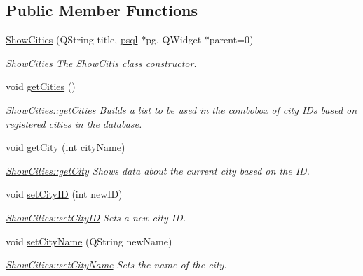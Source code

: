 \subsection*{Public Member Functions}
\begin{DoxyCompactItemize}
\item 
\mbox{\hyperlink{class_show_cities_a71a514390bebd22b5e6ecbb6b731979a}{Show\+Cities}} (Q\+String title, \mbox{\hyperlink{classpsql}{psql}} $\ast$pg, Q\+Widget $\ast$parent=0)
\begin{DoxyCompactList}\small\item\em \mbox{\hyperlink{class_show_cities}{Show\+Cities}} The Show\+Citis class constructor. \end{DoxyCompactList}\item 
\mbox{\label{class_show_cities_a8026675035c0bce6dab846262e1da0c5}} 
void \mbox{\hyperlink{class_show_cities_a8026675035c0bce6dab846262e1da0c5}{get\+Cities}} ()
\begin{DoxyCompactList}\small\item\em \mbox{\hyperlink{class_show_cities_a8026675035c0bce6dab846262e1da0c5}{Show\+Cities\+::get\+Cities}} Builds a list to be used in the combobox of city I\+Ds based on registered cities in the database. \end{DoxyCompactList}\item 
void \mbox{\hyperlink{class_show_cities_af191eeab72b3bdd74f0e710face98292}{get\+City}} (int city\+Name)
\begin{DoxyCompactList}\small\item\em \mbox{\hyperlink{class_show_cities_af191eeab72b3bdd74f0e710face98292}{Show\+Cities\+::get\+City}} Shows data about the current city based on the ID. \end{DoxyCompactList}\item 
void \mbox{\hyperlink{class_show_cities_acd17480ad6a64e989e9aa0b07d30141b}{set\+City\+ID}} (int new\+ID)
\begin{DoxyCompactList}\small\item\em \mbox{\hyperlink{class_show_cities_acd17480ad6a64e989e9aa0b07d30141b}{Show\+Cities\+::set\+City\+ID}} Sets a new city ID. \end{DoxyCompactList}\item 
void \mbox{\hyperlink{class_show_cities_acadd6c1bdb26d30e796bab4b5b2acfd9}{set\+City\+Name}} (Q\+String new\+Name)
\begin{DoxyCompactList}\small\item\em \mbox{\hyperlink{class_show_cities_acadd6c1bdb26d30e796bab4b5b2acfd9}{Show\+Cities\+::set\+City\+Name}} Sets the name of the city. \end{DoxyCompactList}\item 

\end{DoxyCompactItemize}
